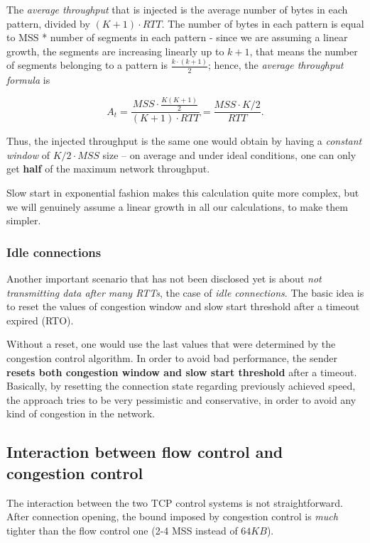\documentclass[10pt]{extbook}
\begin{document}
The \emph{average throughput} that is injected is the average number of bytes in each
pattern, divided by $(K + 1)\cdot RTT$. The number of bytes in each pattern is
equal to MSS * number of segments in each pattern \-- since we are assuming a
linear growth, the segments are increasing linearly up to $k+1$, that means the
number of segments belonging to a pattern is $\frac{k \cdot (k + 1)}{2}$;
hence, the \emph{average throughput formula} is

$$A_t = \frac{MSS\cdot \frac{K(K+1)}{2}}{(K+1)\cdot RTT} = \frac{MSS\cdot
K/2}{RTT}.$$ 

Thus, the injected throughput is the same one would obtain by
having a \emph{constant window} of $K/2 \cdot MSS$ size \--- on average and
under ideal conditions, one can only get \textbf{half} of the maximum network
throughput.

Slow start in exponential fashion makes this calculation quite more complex,
but we will genuinely assume a linear growth in all our calculations, to make
them simpler.

\subsubsection{Idle connections}

Another important scenario that has not been disclosed yet is about \emph{not
transmitting data after many RTTs}, the case of \emph{idle connections}. The
basic idea is to reset the values of congestion window and slow start threshold
after a timeout expired (RTO).

Without a reset, one would use the last values that were determined by the
congestion control algorithm. In order to avoid bad performance, the sender
\textbf{resets both congestion window and slow start threshold} after a
timeout. Basically, by resetting the connection state regarding previously
achieved speed, the approach tries to be very pessimistic and conservative, in
order to avoid any kind of congestion in the network.

\subsection{Interaction between flow control and congestion control}

The interaction between the two TCP control systems is not straightforward.
After connection opening, the bound imposed by congestion control is
\emph{much} tighter than the flow control one (2-4 MSS instead of $64KB$).
\end{document}
